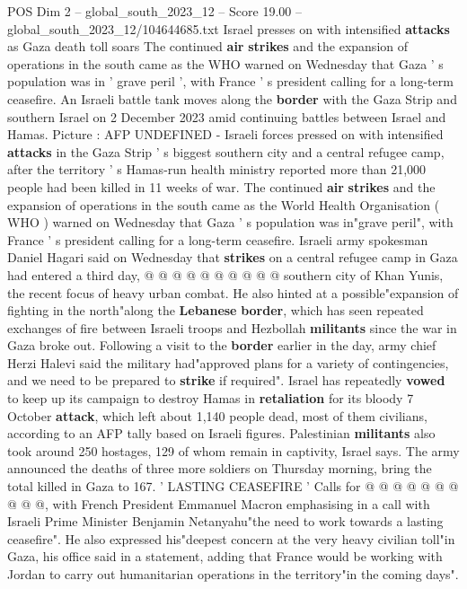 \begin{textsample}{POS Dim 2 – global\_south\_2023\_12 – Score 19.00 – global\_south\_2023\_12/104644685.txt}  \label{ex:f2_pos_160}
Israel presses on with intensified \textbf{attacks} as Gaza death toll soars The continued \textbf{air} \textbf{strikes} and the expansion of operations in the south came as the WHO warned on Wednesday that Gaza ' s population was in ' grave peril ', with France ' s president calling for a long-term ceasefire.
An Israeli battle tank moves along the \textbf{border} with the Gaza Strip and southern Israel on 2 December 2023 amid continuing battles between Israel and Hamas.
Picture : AFP UNDEFINED - Israeli forces pressed on with intensified \textbf{attacks} in the Gaza Strip ' s biggest southern city and a central refugee camp, after the territory ' s Hamas-run health ministry reported more than 21,000 people had been killed in 11 weeks of war.
The continued \textbf{air} \textbf{strikes} and the expansion of operations in the south came as the World Health Organisation ( WHO ) warned on Wednesday that Gaza ' s population was in"grave peril", with France ' s president calling for a long-term ceasefire.
Israeli army spokesman Daniel Hagari said on Wednesday that \textbf{strikes} on a central refugee camp in Gaza had entered a third day, @ @ @ @ @ @ @ @ @ @ southern city of Khan Yunis, the recent focus of heavy urban combat.
He also hinted at a possible"expansion of fighting in the north"along the \textbf{Lebanese} \textbf{border}, which has seen repeated exchanges of fire between Israeli troops and Hezbollah \textbf{militants} since the war in Gaza broke out.
Following a visit to the \textbf{border} earlier in the day, army chief Herzi Halevi said the military had"approved plans for a variety of contingencies, and we need to be prepared to \textbf{strike} if required".
Israel has repeatedly \textbf{vowed} to keep up its campaign to destroy Hamas in \textbf{retaliation} for its bloody 7 October \textbf{attack}, which left about 1,140 people dead, most of them civilians, according to an AFP tally based on Israeli figures.
Palestinian \textbf{militants} also took around 250 hostages, 129 of whom remain in captivity, Israel says.
The army announced the deaths of three more soldiers on Thursday morning, bring the total killed in Gaza to 167. ' LASTING CEASEFIRE ' Calls for @ @ @ @ @ @ @ @ @ @, with French President Emmanuel Macron emphasising in a call with Israeli Prime Minister Benjamin Netanyahu"the need to work towards a lasting ceasefire".
He also expressed his"deepest concern at the very heavy civilian toll"in Gaza, his office said in a statement, adding that France would be working with Jordan to carry out humanitarian operations in the territory"in the coming days".

\end{textsample}
